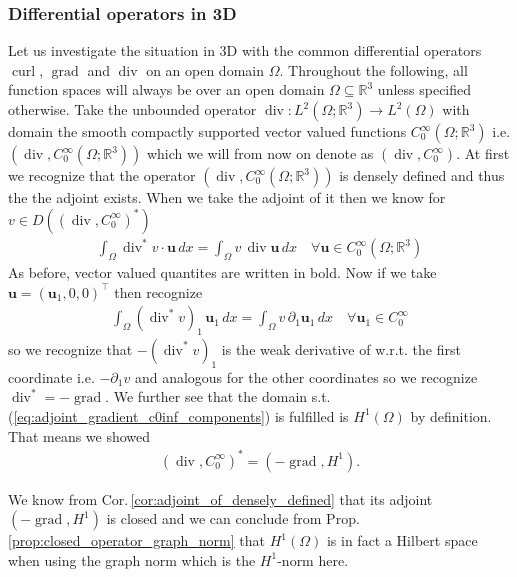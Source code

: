 \documentclass[12pt,a4paper]{article}
\numberwithin{equation}{subsection}
\numberwithin{lemma}{subsection}
\theoremstyle{definition}
\DeclareMathOperator{\curl}{curl}
\DeclareMathOperator{\diver}{div}
\DeclareMathOperator{\grad}{grad}
\newcommand{\real}{\mathbb{R}}
\begin{document}
\subsubsection{Differential operators in 3D}\label{sec:adjoints_differential_operators_3d}

Let us investigate the situation in 3D with the common differential 
operators $\curl$, $\grad$ and $\diver$ on an open domain $\Omega$. Throughout the 
following, all function spaces will always be over an open domain 
$\Omega \subseteq \real^3$ unless specified otherwise.
Take the unbounded operator 
$\diver: L^2(\Omega;\real^3) \rightarrow L^2(\Omega)$ with domain the smooth compactly supported 
vector valued functions
$C_0^\infty(\Omega;\real^3)$ i.e. $(\diver, C_0^\infty(\Omega;\real^3))$ which 
we will from now on denote as $(\diver, C_0^\infty)$. At first we recognize that 
the operator $(\diver, C_0^\infty(\Omega;\real^3))$ is densely defined and thus the the adjoint exists.
When we take the adjoint of it then we know for $v \in 
D((\diver, C_0^\infty)^*)$
\begin{align*}
    \int_\Omega \diver ^* v \cdot \mathbf{u} \, dx
    = \int_\Omega v \, \diver \mathbf{u} \, dx \quad \forall 
    \mathbf{u} \in C_0^\infty(\Omega;\real^3)
\end{align*}
As before, vector valued quantites are written in bold.
Now if we take $\mathbf{u} = (\mathbf{u}_1,0,0)^\top$ then recognize 
\begin{align}
    \int_\Omega (\diver ^* v)_1 \, \mathbf{u}_1 \, dx
    = \int_\Omega v \, \partial_1 \mathbf{u}_1 \, dx \quad 
        \forall \mathbf{u}_1 \in C_0^\infty \label{eq:adjoint_gradient_c0inf_components}
\end{align}
so we recognize that $-(\diver ^* v)_1$ is the weak derivative of w.r.t. the 
first coordinate i.e. $-\partial_1 v$ and analogous for the other coordinates 
so we recognize $\diver^* = -\grad$. We further see that the
domain s.t. (\ref{eq:adjoint_gradient_c0inf_components}) is fulfilled is $H^1(\Omega)$ 
by definition. That means we showed 
\begin{align}
    (\diver, C_0^\infty)^* = (-\grad, H^1). \label{eq:adjoint_gradient_c0inf} 
\end{align}

We know from Cor.\,\ref{cor:adjoint_of_densely_defined} 
that its adjoint $(-\grad, H^1)$ is closed and 
we can conclude from Prop.\,\ref{prop:closed_operator_graph_norm} 
that $H^1(\Omega)$ is in fact a Hilbert space 
when using the graph norm which is the $H^1$-norm here.
\end{document}
